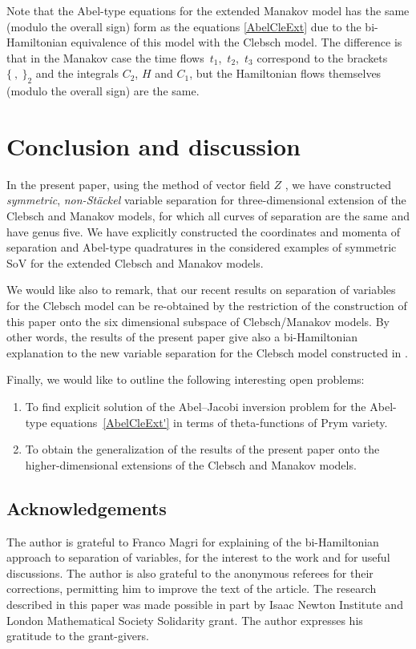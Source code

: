 \documentclass[pdftex]{sigma}
\numberwithin{equation}{section}
\begin{document}
\begin{Remark}
 Note that the Abel-type equations for the extended Manakov model has the same (modulo the overall sign) form as the equations \eqref{AbelCleExt} due to the bi-Hamiltonian equivalence of this model with the Clebsch model. The difference is that in the Manakov case the time flows~$t_1$,~$t_2$,~$t_3$ correspond to the brackets $\{\ ,\ \}_2$ and the integrals $C_2$, $H$ and $C_1$, but the Hamiltonian flows themselves (modulo the overall sign) are the same.
\end{Remark}

\section{Conclusion and discussion}\label{sec6}
In the present paper,
using the method of vector field $Z$ \cite{MFP}, we have constructed {\it symmetric}, {\it non-St\"ackel} variable separation for three-dimensional extension of the Clebsch and Manakov models, for which all curves of separation
 are the same and have genus five.
 We have explicitly constructed the coordinates and momenta of separation %
 and Abel-type quadratures in the considered examples of symmetric SoV for the extended Clebsch and Manakov models.

 We would like also to remark, that our recent results \cite{SkrJGP2025} on separation of variables for the Clebsch model can be re-obtained by the restriction of the construction of this paper onto the six dimensional subspace of Clebsch/Manakov models. By other words, the results of the present paper give also a bi-Hamiltonian explanation to the new variable separation for the Clebsch model constructed in \cite{SkrJGP2025}.

Finally, we would like to outline the following interesting open problems:
\begin{enumerate}\itemsep=0pt
\item[(1)] To find explicit solution of the Abel--Jacobi inversion problem for the Abel-type equations~\eqref{AbelCleExt'} in terms of theta-functions of Prym variety.
 \item[(2)] To obtain the generalization of the results of the present paper onto the higher-dimensional
 extensions of the Clebsch and Manakov models.
 \end{enumerate}

\subsection*{Acknowledgements} The author is grateful to Franco Magri for explaining of the bi-Hamiltonian approach to separation of variables, for the interest to the work and for useful discussions. The author is also grateful to the anonymous referees for their corrections, permitting him to improve the text of the article. The research described in this paper was made possible in part by Isaac Newton Institute and London Mathematical Society Solidarity grant. The author expresses his gratitude to the grant-givers.
\end{document}
